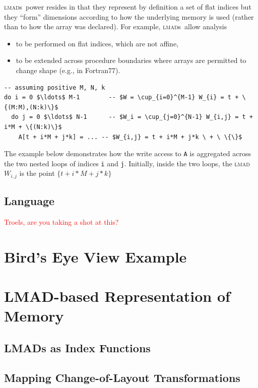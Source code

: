 \documentclass[conference]{IEEEtran}
\newcommand\ToDo[1]{\textcolor{red}{#1}}
\newcommand\lmad{\textsc{lmad~}}
\newcommand\lmads{\textsc{lmad}s~}
\begin{document}
\lmads power resides in that they represent by definition a
set of flat indices but they ``form'' dimensions according to how
the underlying memory is used (rather than to how the array was declared).
%
For example, \lmads allow analysis
\begin{itemize}
\item  to be performed on flat indices, which are not affine,
\item to be extended across procedure boundaries where
     arrays are permitted to change shape (e.g., in Fortran77).
\end{itemize}

\begin{lstlisting}[mathescape,basicstyle=\ttfamily\scriptsize]
-- assuming positive M, N, k
do i = 0 $\ldots$ M-1        -- $W = \cup_{i=0}^{M-1} W_{i} = t + \{(M:M),(N:k)\}$
  do j = 0 $\ldots$ N-1      -- $W_i = \cup_{j=0}^{N-1} W_{i,j} = t + i*M + \{(N:k)\}$
    A[t + i*M + j*k] = ... -- $W_{i,j} = t + i*M + j*k \ + \ \{\}$
\end{lstlisting}
The example below demonstrates how the write access to {\tt A}
is aggregated across the two nested loops of indices {\tt i} and
{\tt j}. Initially, inside the two loops, the \lmad $W_{i,j}$
is the point $\{t + i*M + j*k\}$



\subsection{Language}
\label{subsec:lang-intro}

\ToDo{Troels, are you taking a shot at this?}

\section{Bird's Eye View Example}
\label{sec:nw-hl}

\section{LMAD-based Representation of Memory}
\label{sec:mem-rep}

\subsection{LMADs as Index Functions}
\label{subsec:lmad-ixfn}

\subsection{Mapping Change-of-Layout Transformations}
\label{subsec:lmad-ops}
\end{document}
